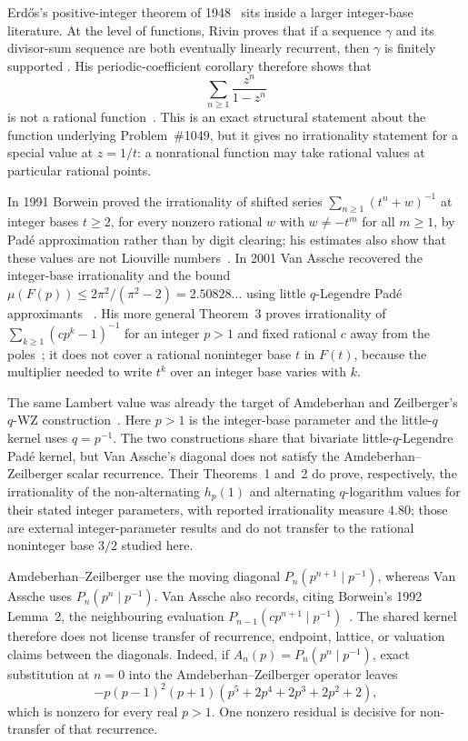 Erd\H{o}s's positive-integer theorem of
1948~\cite{erdos1948} sits inside a larger integer-base literature.
At the level of functions, Rivin proves that if a sequence \(\gamma\) and its
divisor-sum sequence are both eventually linearly recurrent, then \(\gamma\)
is finitely supported
\cite[Theorem~1.1, p.~2; proof pp.~6--7]{rivin2026}.
His periodic-coefficient corollary therefore shows that
\[
  \sum_{n\ge1}\frac{z^n}{1-z^n}
\]
is not a rational function~\cite[Corollary~6.4, p.~9]{rivin2026}.
This is an exact structural statement about the function underlying
Problem~\#1049, but it gives no irrationality statement for a special value
at \(z=1/t\): a nonrational function may take rational values at particular
rational points.

In 1991
Borwein proved the irrationality of shifted series
$\sum_{n\ge1}(t^{n}+w)^{-1}$ at integer bases $t\ge2$, for every nonzero
rational $w$ with $w\ne-t^m$ for all $m\ge1$, by Pad\'e approximation rather
than by digit clearing; his estimates also show that these values are not
Liouville numbers~\cite[Thm.~4, pp.~257--258]{borwein1991}.  In 2001 Van
Assche recovered the integer-base irrationality and the bound
$\mu(F(p))\le 2\pi^2/(\pi^2-2)=2.50828\ldots$ using little $q$-Legendre
Pad\'e approximants
~\cite[Thm.~1, p.~10; proof pp.~10--11]{vanassche2001}.  His more general
Theorem~3 proves irrationality of
$\sum_{k\ge1}(cp^k-1)^{-1}$ for an integer $p>1$ and fixed rational $c$
away from the poles~\cite[Thm.~3, p.~14]{vanassche2001}; it does not cover a
rational noninteger base $t$ in $F(t)$, because the multiplier needed to
write $t^k$ over an integer base varies with $k$.

The same Lambert value was already the target of Amdeberhan and
Zeilberger's $q$-WZ construction~\cite{az1998}.  Here $p>1$ is the integer-base
parameter and the little-$q$ kernel uses $q=p^{-1}$.  The two constructions
share that bivariate little-$q$-Legendre Pad\'e kernel, but Van Assche's
diagonal does not satisfy the Amdeberhan--Zeilberger scalar recurrence.
Their Theorems~1 and~2 do prove, respectively, the irrationality of the
non-alternating $h_p(1)$ and alternating $q$-logarithm values for their stated
integer parameters, with reported irrationality measure $4.80$; those are
external integer-parameter results and do not transfer to the rational
noninteger base $3/2$ studied here.

Amdeberhan--Zeilberger use the moving diagonal
$P_n(p^{n+1}\mid p^{-1})$, whereas Van Assche uses
$P_n(p^n\mid p^{-1})$.  Van Assche also records, citing
Borwein's 1992 Lemma~2, the neighbouring evaluation
$P_{n-1}(c p^{n+1}\mid p^{-1})$~\cite{borwein1992,vanassche2001}.
The shared kernel therefore does not license transfer of recurrence,
endpoint, lattice, or valuation claims between the diagonals.  Indeed, if
$A_n(p)=P_n(p^n\mid p^{-1})$, exact substitution at $n=0$ into the
Amdeberhan--Zeilberger operator leaves
\[
 -p(p-1)^2(p+1)(p^5+2p^4+2p^3+2p^2+2),
\]
which is nonzero for every real $p>1$.  One nonzero residual is decisive for
non-transfer of that recurrence.

